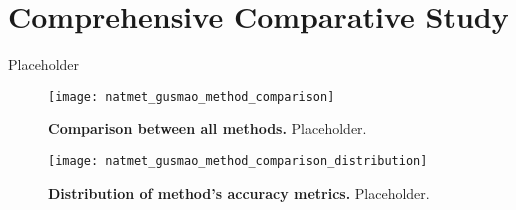\section{Comprehensive Comparative Study}
\label{sec:comprehensive.comparative.study}

Placeholder

\begin{figure}[h!]
\centering
\texttt{[image: natmet\_gusmao\_method\_comparison]}
\caption[Comparison between all methods]{\textbf{Comparison between all methods.} Placeholder.}
\label{fig:natmet_gusmao_method_comparison}
\end{figure}

\begin{figure}[h!]
\centering
\texttt{[image: natmet\_gusmao\_method\_comparison\_distribution]}
\caption[Distribution of method's accuracy metrics]{\textbf{Distribution of method's accuracy metrics.} Placeholder.}
\label{fig:natmet_gusmao_method_comparison_distribution}
\end{figure}




